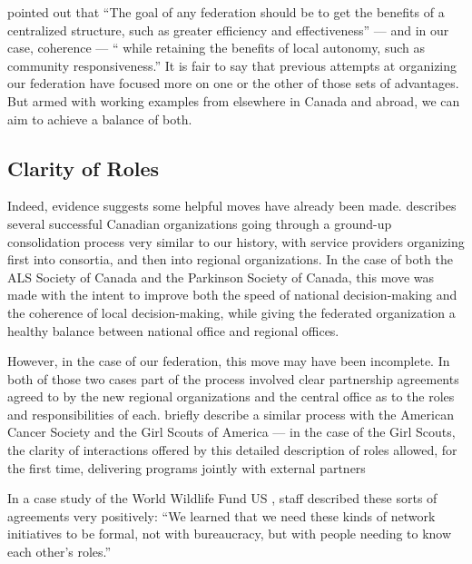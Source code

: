 \documentclass[11pt, letterpaper, twoside]{article}
\begin{document}
\cite{mollenhauer_framework} pointed out that ``The goal of any federation should
be to get the benefits of a centralized structure, such as greater
efficiency and effectiveness'' --- and in our case, coherence --- ``
while retaining the benefits of local autonomy, such as community
responsiveness.''  It is fair to say that previous attempts at
organizing our federation have focused more on one or the other of those
sets of advantages. But armed with working examples from elsewhere in
Canada and abroad, we can aim to achieve a balance of both.

\subsection*{Clarity of Roles}
%

Indeed, evidence suggests some helpful moves have already been made.
\cite{mollenhauer_transformation} describes several successful Canadian organizations
going through a ground-up consolidation process very similar to our
history, with service providers organizing first into consortia, and
then into regional organizations. In the case of both the ALS Society of
Canada and the Parkinson Society of Canada, this move was made with the
intent to improve both the speed of national decision-making and the
coherence of local decision-making, while giving the federated
organization a healthy balance between national office and regional
offices.


However, in the case of our federation, this move may have been
incomplete. In both of those two cases part of the process involved
clear partnership agreements agreed to by the new regional organizations
and the central office as to the roles and responsibilities of each.
\cite{bigbrothers} briefly describe a similar process
with the American Cancer Society and the Girl Scouts of America --- in
the case of the Girl Scouts, the clarity of interactions offered by this
detailed description of roles allowed, for the first time, delivering
programs jointly with external partners

In a case study of the World Wildlife Fund US \citep{wwfus_casestudy},
staff described these sorts of agreements very
positively: ``We learned that we need these kinds of network initiatives
to be formal, not with bureaucracy, but with people needing to know each
other's roles.''
\end{document}
